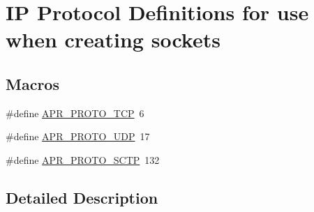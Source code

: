 \hypertarget{group___i_p___proto}{\section{I\-P Protocol Definitions for use when creating sockets}
\label{group___i_p___proto}
}
\subsection*{Macros}
\begin{DoxyCompactItemize}
\item 
\#define \hyperlink{group___i_p___proto_gad231c935f9f9746ca43b46cdcf80338e}{A\-P\-R\-\_\-\-P\-R\-O\-T\-O\-\_\-\-T\-C\-P}~6
\item 
\#define \hyperlink{group___i_p___proto_ga05acc4775ee3f3a637f97c904b8ebd7d}{A\-P\-R\-\_\-\-P\-R\-O\-T\-O\-\_\-\-U\-D\-P}~17
\item 
\#define \hyperlink{group___i_p___proto_ga89b4fd2811d13e945e937f890b750727}{A\-P\-R\-\_\-\-P\-R\-O\-T\-O\-\_\-\-S\-C\-T\-P}~132
\end{DoxyCompactItemize}


\subsection{Detailed Description}


